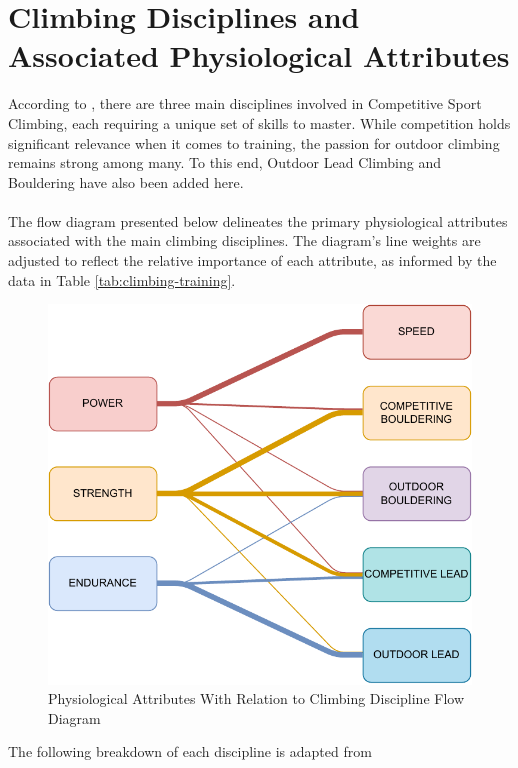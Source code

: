 \section{Climbing Disciplines and Associated Physiological Attributes}
According to \citep{brozek_climbing_2023}, there are three main disciplines involved in Competitive Sport Climbing, each requiring a unique set of skills to master. While competition holds significant relevance when it comes to training, the passion for outdoor climbing remains strong among many. To this end, Outdoor Lead Climbing and Bouldering have also been added here.\\\\
The flow diagram presented below delineates the primary physiological attributes associated with the main climbing disciplines. The diagram's line weights are adjusted to reflect the relative importance of each attribute, as informed by the data in Table \ref{tab:climbing-training}.

\begin{figure}[H]
    \centering
    \includegraphics[width=0.9\linewidth]{figs/disciplines_physical.pdf}
    \caption{Physiological Attributes With Relation to Climbing Discipline Flow Diagram}
    \label{attribs-disc-flow}
\end{figure}
\noindent
The following breakdown of each discipline is adapted from \citep{bechtel_endurance_2024}

